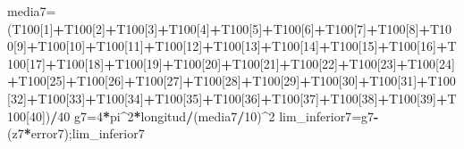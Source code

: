 \documentclass[
]{article}
\newenvironment{Shaded}{\begin{snugshade}}{\end{snugshade}}
\newcommand{\DecValTok}[1]{\textcolor[rgb]{0.00,0.00,0.81}{#1}}
\newcommand{\NormalTok}[1]{#1}
\newcommand{\OtherTok}[1]{\textcolor[rgb]{0.56,0.35,0.01}{#1}}
\newcommand{\SpecialCharTok}[1]{\textcolor[rgb]{0.81,0.36,0.00}{\textbf{#1}}}
\begin{document}
\begin{Shaded}
\begin{Highlighting}[]
\NormalTok{media7}\OtherTok{=}\NormalTok{(T100[}\DecValTok{1}\NormalTok{]}\SpecialCharTok{+}\NormalTok{T100[}\DecValTok{2}\NormalTok{]}\SpecialCharTok{+}\NormalTok{T100[}\DecValTok{3}\NormalTok{]}\SpecialCharTok{+}\NormalTok{T100[}\DecValTok{4}\NormalTok{]}\SpecialCharTok{+}\NormalTok{T100[}\DecValTok{5}\NormalTok{]}\SpecialCharTok{+}\NormalTok{T100[}\DecValTok{6}\NormalTok{]}\SpecialCharTok{+}\NormalTok{T100[}\DecValTok{7}\NormalTok{]}\SpecialCharTok{+}\NormalTok{T100[}\DecValTok{8}\NormalTok{]}\SpecialCharTok{+}\NormalTok{T100[}\DecValTok{9}\NormalTok{]}\SpecialCharTok{+}\NormalTok{T100[}\DecValTok{10}\NormalTok{]}\SpecialCharTok{+}\NormalTok{T100[}\DecValTok{11}\NormalTok{]}\SpecialCharTok{+}\NormalTok{T100[}\DecValTok{12}\NormalTok{]}\SpecialCharTok{+}\NormalTok{T100[}\DecValTok{13}\NormalTok{]}\SpecialCharTok{+}\NormalTok{T100[}\DecValTok{14}\NormalTok{]}\SpecialCharTok{+}\NormalTok{T100[}\DecValTok{15}\NormalTok{]}\SpecialCharTok{+}\NormalTok{T100[}\DecValTok{16}\NormalTok{]}\SpecialCharTok{+}\NormalTok{T100[}\DecValTok{17}\NormalTok{]}\SpecialCharTok{+}\NormalTok{T100[}\DecValTok{18}\NormalTok{]}\SpecialCharTok{+}\NormalTok{T100[}\DecValTok{19}\NormalTok{]}\SpecialCharTok{+}\NormalTok{T100[}\DecValTok{20}\NormalTok{]}\SpecialCharTok{+}\NormalTok{T100[}\DecValTok{21}\NormalTok{]}\SpecialCharTok{+}\NormalTok{T100[}\DecValTok{22}\NormalTok{]}\SpecialCharTok{+}\NormalTok{T100[}\DecValTok{23}\NormalTok{]}\SpecialCharTok{+}\NormalTok{T100[}\DecValTok{24}\NormalTok{]}\SpecialCharTok{+}\NormalTok{T100[}\DecValTok{25}\NormalTok{]}\SpecialCharTok{+}\NormalTok{T100[}\DecValTok{26}\NormalTok{]}\SpecialCharTok{+}\NormalTok{T100[}\DecValTok{27}\NormalTok{]}\SpecialCharTok{+}\NormalTok{T100[}\DecValTok{28}\NormalTok{]}\SpecialCharTok{+}\NormalTok{T100[}\DecValTok{29}\NormalTok{]}\SpecialCharTok{+}\NormalTok{T100[}\DecValTok{30}\NormalTok{]}\SpecialCharTok{+}\NormalTok{T100[}\DecValTok{31}\NormalTok{]}\SpecialCharTok{+}\NormalTok{T100[}\DecValTok{32}\NormalTok{]}\SpecialCharTok{+}\NormalTok{T100[}\DecValTok{33}\NormalTok{]}\SpecialCharTok{+}\NormalTok{T100[}\DecValTok{34}\NormalTok{]}\SpecialCharTok{+}\NormalTok{T100[}\DecValTok{35}\NormalTok{]}\SpecialCharTok{+}\NormalTok{T100[}\DecValTok{36}\NormalTok{]}\SpecialCharTok{+}\NormalTok{T100[}\DecValTok{37}\NormalTok{]}\SpecialCharTok{+}\NormalTok{T100[}\DecValTok{38}\NormalTok{]}\SpecialCharTok{+}\NormalTok{T100[}\DecValTok{39}\NormalTok{]}\SpecialCharTok{+}\NormalTok{T100[}\DecValTok{40}\NormalTok{])}\SpecialCharTok{/}\DecValTok{40}
\NormalTok{g7}\OtherTok{=}\DecValTok{4}\SpecialCharTok{*}\NormalTok{pi}\SpecialCharTok{\^{}}\DecValTok{2}\SpecialCharTok{*}\NormalTok{longitud}\SpecialCharTok{/}\NormalTok{(media7}\SpecialCharTok{/}\DecValTok{10}\NormalTok{)}\SpecialCharTok{\^{}}\DecValTok{2}
\NormalTok{lim\_inferior7}\OtherTok{=}\NormalTok{g7}\SpecialCharTok{{-}}\NormalTok{(z7}\SpecialCharTok{*}\NormalTok{error7);lim\_inferior7}
\end{Highlighting}
\end{Shaded}
\end{document}
